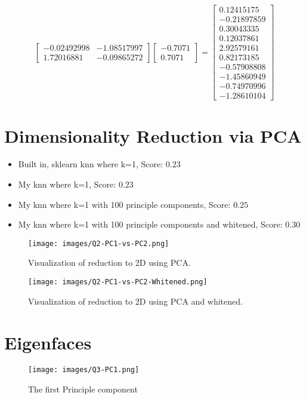 \documentclass[12pt]{article}
\begin{document}
\begin{enumerate}
\begin{enumerate}
\begin{center}
$$\begin{bmatrix}
-0.02492998 & -1.08517997 \\
 1.72016881 & -0.09865272
\end{bmatrix}
\begin{bmatrix}
-0.7071 \\
0.7071
\end{bmatrix}
=
\begin{bmatrix}
 0.12415175 \\
-0.21897859 \\
 0.30043335 \\
 0.12037861 \\
 2.92579161 \\
 0.82173185 \\
-0.57908808 \\
-1.45860949 \\
-0.74970996 \\
-1.28610104
\end{bmatrix}
$$
\end{center}
    \end{enumerate}
\end{enumerate}


\newpage
\section{Dimensionality Reduction via PCA}
\begin{itemize}
    \item Built in, sklearn knn where k=1, Score: $0.23$
    \item My knn where k=1, Score: $0.23$
    \item My knn where k=1 with 100 principle components, Score: $0.25$
    \item My knn where k=1 with 100 principle components and whitened, Score: $0.30$
\end{itemize}
\begin{figure}[h]
\centering
\texttt{[image: images/Q2-PC1-vs-PC2.png]}
\caption{Visualization of reduction to 2D using PCA.}
\end{figure}

\begin{figure}[h]
\centering
\texttt{[image: images/Q2-PC1-vs-PC2-Whitened.png]}
\caption{Visualization of reduction to 2D using PCA and whitened.}
\end{figure}

\newpage
\section{Eigenfaces}
\begin{figure}[h!]
    \centering
    \texttt{[image: images/Q3-PC1.png]}
    \caption{The first Principle component}
\end{figure}
\end{document}
